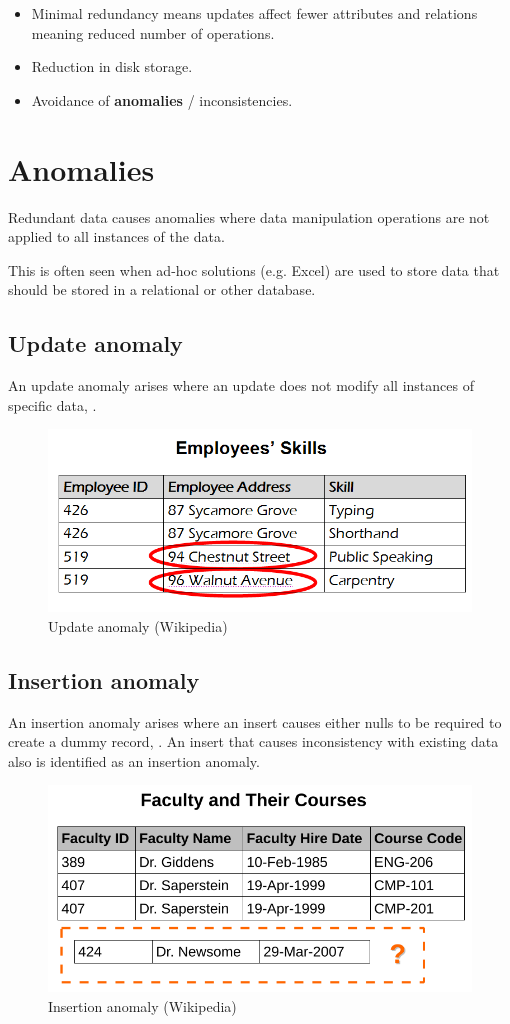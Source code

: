\documentclass[slides]{pgnotes}
\begin{document}
\begin{itemize}
\item
  Minimal redundancy means updates affect fewer attributes and
  relations meaning reduced number of operations.
\item
  Reduction in disk storage.
\item
  Avoidance of \textbf{anomalies} / inconsistencies.
\end{itemize}

\newpage
\section{Anomalies}\label{anomalies}

Redundant data causes anomalies where data manipulation operations are
not applied to all instances of the data.

This is often seen when ad-hoc solutions (e.g. Excel) are used to store data that should be stored in a relational or other database. 

\subsection{Update anomaly}\label{update}

An update anomaly arises where an update does not modify all instances
of specific data, .

\begin{figure}[htbp]
\centering
\includegraphics[width=0.5\linewidth]{update_anomaly}
\caption{Update anomaly (Wikipedia){}}
\end{figure}

\subsection{Insertion anomaly}\label{insertion}

An insertion anomaly arises where an insert causes either nulls to be
required to create a dummy record, .
An insert that causes inconsistency with existing data also is
identified as an insertion anomaly.

\begin{figure}[htbp]
\centering
\includegraphics[width=0.5\linewidth]{insertion_anomaly}
\caption{Insertion anomaly (Wikipedia){}}
\end{figure}
\end{document}
